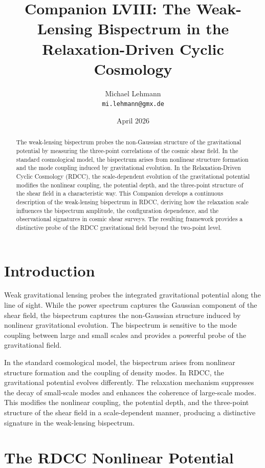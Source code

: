 \documentclass[11pt,a4paper]{article}
\title{\textbf{Companion LVIII: The Weak-Lensing Bispectrum in the Relaxation-Driven Cyclic Cosmology}}
\author{Michael Lehmann \\ \texttt{mi.lehmann@gmx.de}}
\date{April 2026}
\begin{document}
\maketitle

\begin{abstract}
The weak-lensing bispectrum probes the non-Gaussian structure of the gravitational 
potential by measuring the three-point correlations of the cosmic shear field. In 
the standard cosmological model, the bispectrum arises from nonlinear structure 
formation and the mode coupling induced by gravitational evolution. In the 
Relaxation-Driven Cyclic Cosmology (RDCC), the scale-dependent evolution of the 
gravitational potential modifies the nonlinear coupling, the potential depth, and 
the three-point structure of the shear field in a characteristic way. This 
Companion develops a continuous description of the weak-lensing bispectrum in 
RDCC, deriving how the relaxation scale influences the bispectrum amplitude, the 
configuration dependence, and the observational signatures in cosmic shear 
surveys. The resulting framework provides a distinctive probe of the RDCC 
gravitational field beyond the two-point level.
\end{abstract}
\section{Introduction}

Weak gravitational lensing probes the integrated gravitational potential along the 
line of sight. While the power spectrum captures the Gaussian component of the 
shear field, the bispectrum captures the non-Gaussian structure induced by 
nonlinear gravitational evolution. The bispectrum is sensitive to the mode 
coupling between large and small scales and provides a powerful probe of the 
gravitational field.

In the standard cosmological model, the bispectrum arises from nonlinear structure 
formation and the coupling of density modes. In RDCC, the gravitational potential 
evolves differently. The relaxation mechanism suppresses the decay of small-scale 
modes and enhances the coherence of large-scale modes. This modifies the nonlinear 
coupling, the potential depth, and the three-point structure of the shear field in 
a scale-dependent manner, producing a distinctive signature in the weak-lensing 
bispectrum.
\section{The RDCC Nonlinear Potential}
\end{document}

